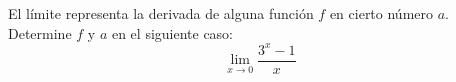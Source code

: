 \item El límite representa la derivada de alguna función $f$ en cierto número $a$. Determine $f$ y $a$ en el siguiente caso:
$$\lim_{x \to 0} \frac{3^x - 1}{x}$$
